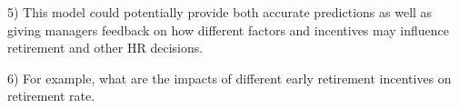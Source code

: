 \documentclass[12pt,letterpaper]{article}
\begin{document}
5) This model could potentially provide both accurate predictions as well as giving managers feedback on how different factors and incentives may influence retirement and other HR decisions.

6) For example, what are the impacts of different early retirement incentives on retirement rate.  



\end{document}
